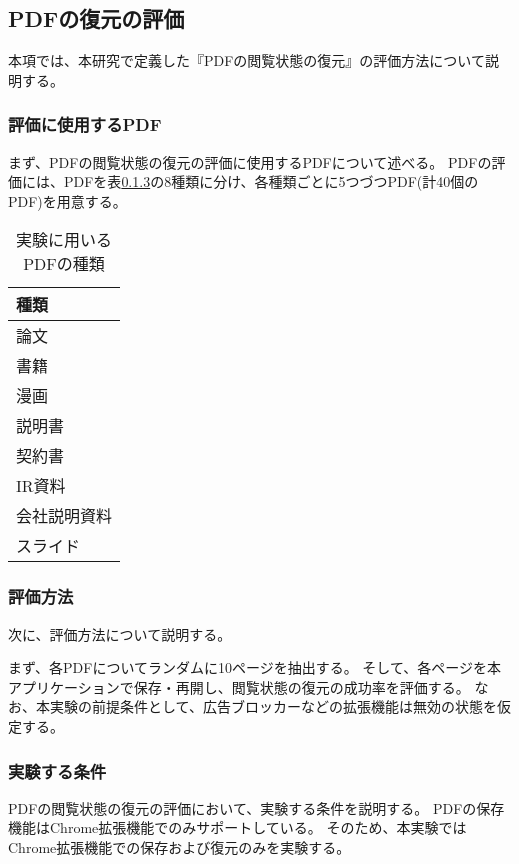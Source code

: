 \subsection{PDFの復元の評価}
本項では、本研究で定義した『PDFの閲覧状態の復元』の評価方法について説明する。


\subsubsection{評価に使用するPDF}
まず、PDFの閲覧状態の復元の評価に使用するPDFについて述べる。
PDFの評価には、PDFを表\ref{}の8種類に分け、各種類ごとに5つづつPDF(計40個のPDF)を用意する。

\begin{table}[htbp]
  \label{tb:evl-pdf-list}
  \caption{実験に用いるPDFの種類}
  \begin{center}
    \begin{tabular}{|l|}
    \hline
    種類  \\\hline\hline
    論文 \\ \hline
    書籍 \\ \hline
    漫画 \\ \hline
    説明書 \\ \hline
    契約書 \\ \hline
    IR資料 \\ \hline
    会社説明資料 \\ \hline
    スライド \\ \hline
    \end{tabular}
  \end{center}
\end{table}

\subsubsection{評価方法}
次に、評価方法について説明する。

まず、各PDFについてランダムに10ページを抽出する。
そして、各ページを本アプリケーションで保存・再開し、閲覧状態の復元の成功率を評価する。
なお、本実験の前提条件として、広告ブロッカーなどの拡張機能は無効の状態を仮定する。

\subsubsection{実験する条件}
PDFの閲覧状態の復元の評価において、実験する条件を説明する。
PDFの保存機能はChrome拡張機能でのみサポートしている。
そのため、本実験ではChrome拡張機能での保存および復元のみを実験する。
